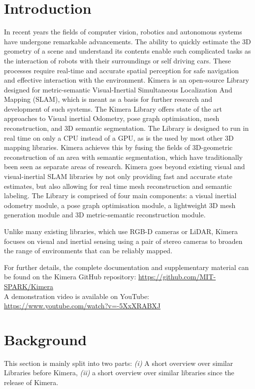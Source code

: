 \documentclass[11pt,a4paper]{article}
\begin{document}
\section{Introduction}\label{Sec:Intro}
In recent years the fields of computer vision, robotics and autonomous systems have undergone remarkable advancements. The ability to quickly estimate the 3D geometry of a scene and understand its contents enable such complicated tasks as the interaction of robots with their surroundings or self driving cars. 
These processes require real-time and accurate spatial perception for safe navigation and effective interaction with the environment.
Kimera \cite{rosinol2020kimera} is an open-source Library designed for metric-semantic Visual-Inertial Simultaneous Localization And Mapping (SLAM), which is meant as a basis for further research and development of such systems. The Kimera Library offers state of the art approaches to Visual inertial Odometry, pose graph optimisation, mesh reconstruction, and 3D semantic segmentation.
The Library is designed to run in real time on only a CPU instead of a GPU, as is the used by most other 3D mapping libraries. 
Kimera achieves this by fusing the fields of 3D-geometric reconstruction of an area with semantic segmentation, which have traditionally been seen as separate areas of research. 
Kimera goes beyond existing visual and visual-inertial SLAM libraries by not only providing fast and accurate state estimates, but also allowing for real time mesh reconstruction and semantic labeling.
The Library is comprised of four main components: a visual inertial odometry module, a pose graph optimisation module, a lightweight 3D mesh generation module and 3D metric-semantic reconstruction module.

Unlike many existing libraries, which use RGB-D cameras or LiDAR, Kimera focuses on visual and inertial sensing using a pair of stereo cameras to broaden the range of environments that can be reliably mapped. 

For further details, the complete documentation and supplementary material can be found on the Kimera GitHub repository: \url{https://github.com/MIT-SPARK/Kimera}\\ A demonstration video is available on YouTube: \url{https://www.youtube.com/watch?v=-5XxXRABXJ}
\section{Background} \label{Sec:background}
This section is mainly split into two parts: \emph{(i)} A short overview over similar Libraries before Kimera, \emph{(ii)} a short overview over similar libraries since the release of Kimera.
\end{document}
